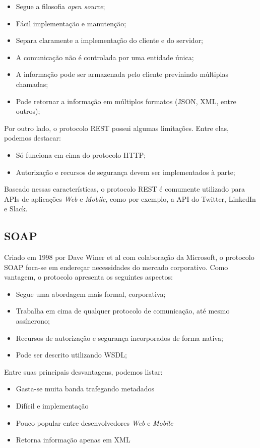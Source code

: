 \begin{itemize}
\item Segue a filosofia \textit{open source};
\item Fácil implementação e manutenção;
\item Separa claramente a implementação do cliente e do servidor;
\item A comunicação não é controlada por uma entidade única;
\item A informação pode ser armazenada pelo cliente previnindo múltiplas chamadas;
\item Pode retornar a informação em múltiplos formatos (JSON, XML, entre outros);
\end{itemize}

Por outro lado, o protocolo REST possui algumas limitações. Entre elas, podemos destacar:

\begin{itemize}
	\item Só funciona em cima do protocolo HTTP;
	\item Autorização e recursos de segurança devem ser implementados à parte;
\end{itemize}

Baseado nessas características, o protocolo REST é comumente utilizado para APIs de aplicações \textit{Web} e \textit{Mobile}, como por exemplo, a API do Twitter, LinkedIn e Slack.

\subsection{SOAP}
Criado em 1998 por Dave Winer et al com colaboração da Microsoft, o protocolo SOAP foca-se em endereçar necessidades do mercado corporativo. Como vantagem, o protocolo apresenta os seguintes aspectos:

\begin{itemize}
	\item Segue uma abordagem mais formal, corporativa;
	\item Trabalha em cima de qualquer protocolo de comunicação, até mesmo assíncrono;
	\item Recursos de autorização e segurança incorporados de forma nativa;
	\item Pode ser descrito utilizando WSDL;
\end{itemize}

Entre suas principais desvantagens, podemos listar:

\begin{itemize}
	\item Gasta-se muita banda trafegando metadados
	\item Difícil e implementação
	\item Pouco popular entre desenvolvedores \textit{Web} e \textit{Mobile}
	\item Retorna informação apenas em XML
\end{itemize}

